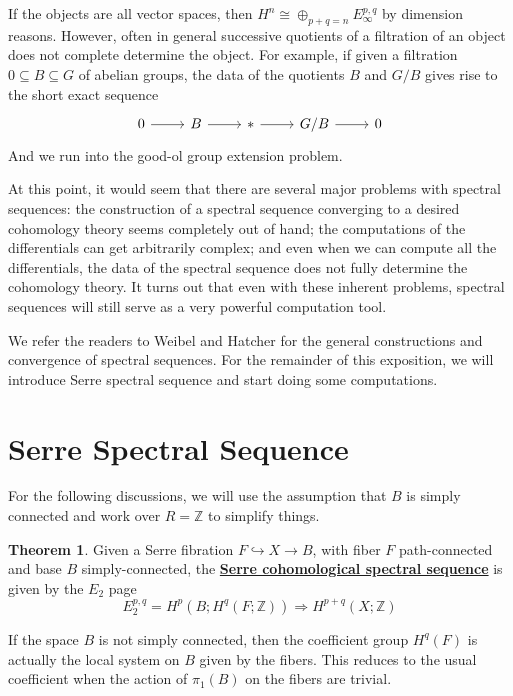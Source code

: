 \documentclass{article}
\theoremstyle{definition}
\newtheorem{theorem}{Theorem}[section]
\theoremstyle{definition}
\theoremstyle{definition}
\theoremstyle{definition}
\theoremstyle{definition}
\theoremstyle{definition}
\begin{document}
If the objects are all vector spaces, then $H^n\cong \oplus_{p+q=n} E_{\infty}^{p,q}$ by dimension reasons. However, often in general successive quotients of a filtration of an object does not complete determine the object. For example, if given a filtration $0\subseteq B\subseteq G$
of abelian groups, the data of the quotients $B$ and $G/B$ gives rise to the short exact sequence 
\[\begin{tikzcd}
0\arrow[r]&B\arrow[r]&*\arrow[r]&G/B\arrow[r]&0
\end{tikzcd}\]
And we run into the good-ol group extension problem. 

At this point, it would seem that there are several major problems with spectral sequences: the construction of a spectral sequence converging to a desired cohomology theory seems completely out of hand; the computations of the differentials can get arbitrarily complex; and even when we can compute all the differentials, the data of the spectral sequence does not fully determine the cohomology theory. It turns out that even with these inherent problems, spectral sequences will still serve as a very powerful computation tool.

We refer the readers to Weibel and Hatcher for the general constructions and convergence of spectral sequences. For the remainder of this exposition, we will introduce Serre spectral sequence and start doing some computations.

\section{Serre Spectral Sequence}
For the following discussions, we will use the assumption that $B$ is simply connected and work over $R=\mathbb{Z}$ to simplify things. 


\begin{tcolorbox}[colback=red!5!white,colframe=red!30!white]
\begin{theorem}
	Given a Serre fibration $F\hookrightarrow X\to B$, with fiber $F$ path-connected and base $B$ simply-connected, the \underline{\textbf{Serre cohomological spectral sequence}} is given by the $E_2$ page 
	\[
	E_2^{p,q}=H ^{p}(B; H ^{q}(F; \mathbb{Z})) \Longrightarrow H ^{p+q}(X; \mathbb{Z})
	\]
\end{theorem}
\end{tcolorbox}

If the space $B$ is not simply connected, then the coefficient group $H ^{q}(F)$ is actually the local system on $B$ given by the fibers. This reduces to the usual coefficient when the action of $\pi_1(B)$ on the fibers are trivial.
\end{document}
